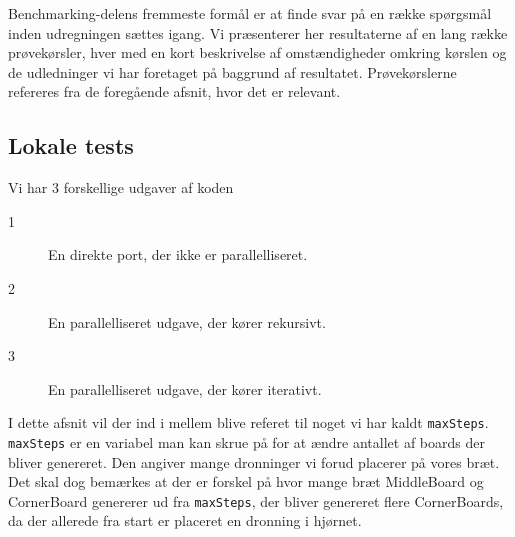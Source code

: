 Benchmarking-delens fremmeste formål er at finde svar på en række spørgsmål
inden udregningen sættes igang. Vi præsenterer her resultaterne af en lang række prøvekørsler, hver med en kort beskrivelse af omstændigheder omkring kørslen og de udledninger vi har foretaget på baggrund af resultatet. Prøvekørslerne refereres fra de foregående afsnit, hvor det er relevant.

\subsection{Lokale tests}

Vi har 3 forskellige udgaver af koden
\begin{description}
\item[1] En direkte port, der ikke er parallelliseret.
\item[2] En parallelliseret udgave, der kører rekursivt.
\item[3] En parallelliseret udgave, der kører iterativt.
\end{description}

I dette afsnit vil der ind i mellem blive referet til noget vi har kaldt
\texttt{maxSteps}. \texttt{maxSteps} er en variabel man kan skrue på for at
ændre antallet af boards der bliver genereret. Den angiver mange dronninger vi
forud placerer på vores bræt. Det skal dog bemærkes at der er forskel på hvor
mange bræt MiddleBoard og CornerBoard genererer ud fra \texttt{maxSteps}, der
bliver genereret flere CornerBoards, da der allerede fra start er placeret en
dronning i hjørnet.


